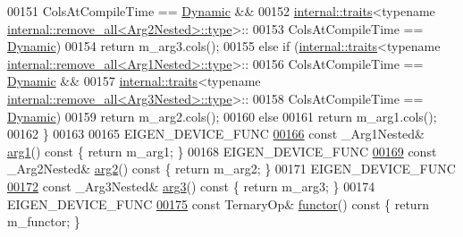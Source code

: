 \begin{DoxyCode}
00151                 ColsAtCompileTime == \hyperlink{namespace_eigen_ad81fa7195215a0ce30017dfac309f0b2}{Dynamic} &&
00152         \hyperlink{struct_eigen_1_1internal_1_1traits}{internal::traits}<\textcolor{keyword}{typename} 
      \hyperlink{group___sparse_core___module}{internal::remove\_all<Arg2Nested>::type}>::
00153                 ColsAtCompileTime == \hyperlink{namespace_eigen_ad81fa7195215a0ce30017dfac309f0b2}{Dynamic})
00154       \textcolor{keywordflow}{return} m\_arg3.cols();
00155     \textcolor{keywordflow}{else} \textcolor{keywordflow}{if} (\hyperlink{struct_eigen_1_1internal_1_1traits}{internal::traits}<\textcolor{keyword}{typename} 
      \hyperlink{group___sparse_core___module}{internal::remove\_all<Arg1Nested>::type}>::
00156                      ColsAtCompileTime == \hyperlink{namespace_eigen_ad81fa7195215a0ce30017dfac309f0b2}{Dynamic} &&
00157              \hyperlink{struct_eigen_1_1internal_1_1traits}{internal::traits}<\textcolor{keyword}{typename} 
      \hyperlink{group___sparse_core___module}{internal::remove\_all<Arg3Nested>::type}>::
00158                      ColsAtCompileTime == \hyperlink{namespace_eigen_ad81fa7195215a0ce30017dfac309f0b2}{Dynamic})
00159       \textcolor{keywordflow}{return} m\_arg2.cols();
00160     \textcolor{keywordflow}{else}
00161       \textcolor{keywordflow}{return} m\_arg1.cols();
00162   \}
00163 
00165   EIGEN\_DEVICE\_FUNC
\hyperlink{group___core___module_a37ec6f7c9b863f58a3e193cac44bdd82}{00166}   \textcolor{keyword}{const} \_Arg1Nested& \hyperlink{group___core___module_a37ec6f7c9b863f58a3e193cac44bdd82}{arg1}()\textcolor{keyword}{ const }\{ \textcolor{keywordflow}{return} m\_arg1; \}
00168   EIGEN\_DEVICE\_FUNC
\hyperlink{group___core___module_a271606675838696dd7660d4d847ae5f7}{00169}   \textcolor{keyword}{const} \_Arg2Nested& \hyperlink{group___core___module_a271606675838696dd7660d4d847ae5f7}{arg2}()\textcolor{keyword}{ const }\{ \textcolor{keywordflow}{return} m\_arg2; \}
00171   EIGEN\_DEVICE\_FUNC
\hyperlink{group___core___module_aab71f401afd7ebc25428369c30151a1f}{00172}   \textcolor{keyword}{const} \_Arg3Nested& \hyperlink{group___core___module_aab71f401afd7ebc25428369c30151a1f}{arg3}()\textcolor{keyword}{ const }\{ \textcolor{keywordflow}{return} m\_arg3; \}
00174   EIGEN\_DEVICE\_FUNC
\hyperlink{group___core___module_acec526305dd83e6c0b3bd2cdbfd19307}{00175}   \textcolor{keyword}{const} TernaryOp& \hyperlink{group___core___module_acec526305dd83e6c0b3bd2cdbfd19307}{functor}()\textcolor{keyword}{ const }\{ \textcolor{keywordflow}{return} m\_functor; \}

\end{DoxyCode}
